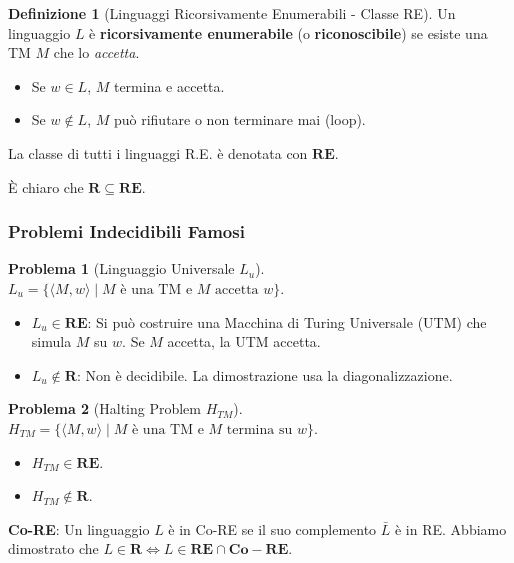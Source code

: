 \documentclass[a4paper]{article}
\theoremstyle{definition} %
\newtheorem{definition}{Definizione}
\newtheorem{problem}{Problema}[subsection]
\newcommand{\tuple}[1]{\langle#1\rangle}
\begin{document}
\begin{definition}[Linguaggi Ricorsivamente Enumerabili - Classe RE]
Un linguaggio $L$ è \textbf{ricorsivamente enumerabile} (o \textbf{riconoscibile}) se esiste una TM $M$ che lo \emph{accetta}.
\begin{itemize}
    \item Se $w \in L$, $M$ termina e accetta.
    \item Se $w \notin L$, $M$ può rifiutare o non terminare mai (loop).
\end{itemize}
La classe di tutti i linguaggi R.E. è denotata con $\mathbf{RE}$.
\end{definition}
È chiaro che $\mathbf{R} \subseteq \mathbf{RE}$.

\subsubsection{Problemi Indecidibili Famosi}
\begin{problem}[Linguaggio Universale $L_u$]
$L_u = \{ \tuple{M, w} \mid M \text{ è una TM e } M \text{ accetta } w \}$.
\begin{itemize}
    \item $L_u \in \mathbf{RE}$: Si può costruire una Macchina di Turing Universale (UTM) che simula $M$ su $w$. Se $M$ accetta, la UTM accetta.
    \item $L_u \notin \mathbf{R}$: Non è decidibile. La dimostrazione usa la diagonalizzazione.
\end{itemize}
\end{problem}
\begin{problem}[Halting Problem $H_{TM}$]
$H_{TM} = \{ \tuple{M, w} \mid M \text{ è una TM e } M \text{ termina su } w \}$.
\begin{itemize}
    \item $H_{TM} \in \mathbf{RE}$.
    \item $H_{TM} \notin \mathbf{R}$.
\end{itemize}
\end{problem}
\textbf{Co-RE}: Un linguaggio $L$ è in Co-RE se il suo complemento $\bar{L}$ è in RE. Abbiamo dimostrato che $L \in \mathbf{R} \iff L \in \mathbf{RE} \cap \mathbf{Co-RE}$.
\end{document}
